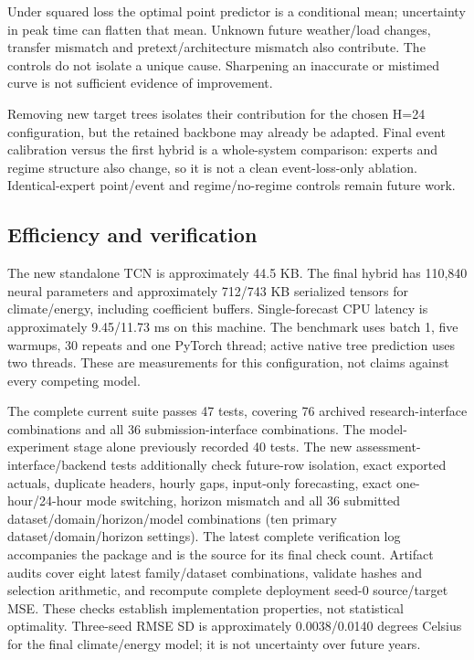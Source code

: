 Under squared loss the optimal point predictor is a conditional mean; uncertainty in peak time can flatten that mean. Unknown future weather/load changes, transfer mismatch and pretext/architecture mismatch also contribute. The controls do not isolate a unique cause. Sharpening an inaccurate or mistimed curve is not sufficient evidence of improvement.

Removing new target trees isolates their contribution for the chosen H=24 configuration, but the retained backbone may already be adapted. Final event calibration versus the first hybrid is a whole-system comparison: experts and regime structure also change, so it is not a clean event-loss-only ablation. Identical-expert point/event and regime/no-regime controls remain future work.
\FloatBarrier

\subsection{Efficiency and verification}

The new standalone TCN is approximately 44.5 KB. The final hybrid has 110,840 neural parameters and approximately 712/743 KB serialized tensors for climate/energy, including coefficient buffers. Single-forecast CPU latency is approximately 9.45/11.73 ms on this machine. The benchmark uses batch 1, five warmups, 30 repeats and one PyTorch thread; active native tree prediction uses two threads. These are measurements for this configuration, not claims against every competing model.

The complete current suite passes 47 tests, covering 76 archived research-interface combinations and all 36 submission-interface combinations. The model-experiment stage alone previously recorded 40 tests. The new assessment-interface/backend tests additionally check future-row isolation, exact exported actuals, duplicate headers, hourly gaps, input-only forecasting, exact one-hour/24-hour mode switching, horizon mismatch and all 36 submitted dataset/domain/horizon/model combinations (ten primary dataset/domain/horizon settings). The latest complete verification log accompanies the package and is the source for its final check count. Artifact audits cover eight latest family/dataset combinations, validate hashes and selection arithmetic, and recompute complete deployment seed-0 source/target MSE. These checks establish implementation properties, not statistical optimality. Three-seed RMSE SD is approximately 0.0038/0.0140 degrees Celsius for the final climate/energy model; it is not uncertainty over future years.

